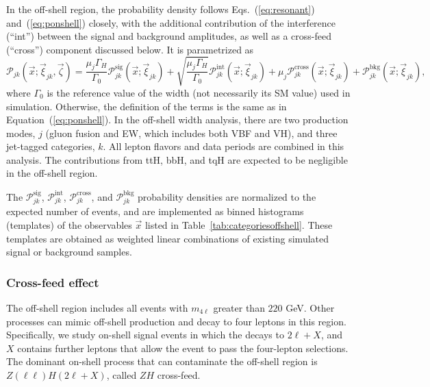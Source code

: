 In the off-shell region, the probability density follows Eqs.~(\ref{eq:resonant}) and~(\ref{eq:ponshell}) closely,
with the additional contribution of the interference (``int'') between the signal and background amplitudes,
as well as a cross-feed (``cross'') component discussed below. It is parametrized as 
\begin{equation}\label{eq:poffshell}
    \mathcal{P}_{jk}(\vec{x};\vec{\xi}_{jk},\vec\zeta) =
    \frac{\mu_j \Gamma_H}{\Gamma_0}\mathcal{P}_{jk}^\text{sig} ( \vec{x};\vec{\xi}_{jk})
    + \sqrt{\frac{\mu_j \Gamma_H}{\Gamma_0}}\mathcal{P}_{jk}^\mathrm{int} ( \vec{x};\vec{\xi}_{jk})
    + \mu_j\mathcal{P}_{jk}^\text{cross} (\vec{x};\vec{\xi}_{jk})
    + \mathcal{P}_{jk}^\text{bkg} ( \vec{x};\vec{\xi}_{jk}),
\end{equation}
where $\Gamma_0$ is the reference value of the \Hboson width (not necessarily its SM value)
used in simulation. Otherwise, the definition of the terms is the same as in Equation~(\ref{eq:ponshell}). 
In the off-shell width analysis, there are two production modes, $j$ (gluon fusion and EW, which includes both VBF and VH), 
and three jet-tagged categories, $k$. All lepton flavors and data periods are combined in this analysis.
The contributions from ttH, bbH, and tqH are expected to be negligible in the off-shell region.

The $\mathcal{P}_{jk}^{\text{sig}}$, $\mathcal{P}_{jk}^{\text{int}}$, $\mathcal{P}_{jk}^{\text{cross}}$, and $\mathcal{P}_{jk}^\text{bkg}$ probability densities
are normalized to the expected number of events, and are implemented as binned histograms (templates)
of the observables $\vec{x}$ listed in Table~\ref{tab:categoriesoffshell}.
These templates are obtained as weighted linear combinations of existing simulated signal or background samples.

\subsubsection{Cross-feed effect}

The off-shell region includes all events with $m_{4\ell}$ greater than $220$ GeV. 
Other processes can mimic off-shell \Hboson production and decay to four leptons in this region. 
Specifically, we study on-shell signal events in which the \Hboson decays 
to $2\ell +X$, and $X$ contains further leptons that allow the event to pass the four-lepton selections. 
The dominant on-shell \Hboson process that can contaminate the off-shell region is $Z(\ell\ell)H(2\ell+X)$, called $ZH$ cross-feed. 

